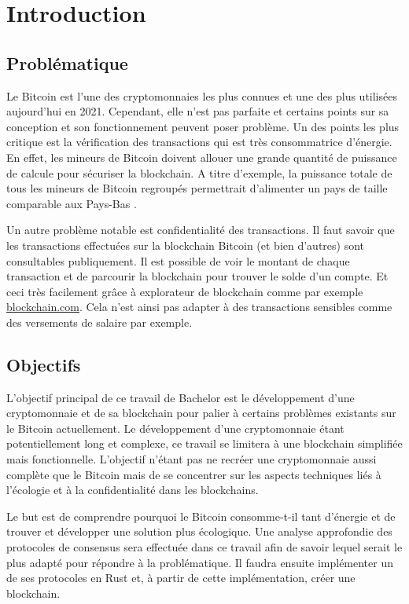 \documentclass[../tb_report.tex]{subfiles}
\begin{document}
\chapter{Introduction}
\label{ch:intro}

\section{Problématique}

Le Bitcoin est l'une des cryptomonnaies les plus connues et une des plus utilisées aujourd'hui en 2021. Cependant, elle n'est pas parfaite et certains points sur sa conception et son fonctionnement peuvent poser problème. Un des points les plus critique est la vérification des transactions qui est très consommatrice d'énergie. En effet, les mineurs de Bitcoin doivent allouer une grande quantité de puissance de calcule pour sécuriser la blockchain. A titre d'exemple, la puissance totale de tous les mineurs de Bitcoin regroupés permettrait d'alimenter un pays de taille comparable aux Pays-Bas \cite{BTC_cons}. 

Un autre problème notable est confidentialité des transactions. Il faut savoir que les transactions effectuées sur la blockchain Bitcoin (et bien d'autres) sont consultables publiquement. Il est possible de voir le montant de chaque transaction et de parcourir la blockchain pour trouver le solde d'un compte. Et ceci très facilement grâce à explorateur de blockchain comme par exemple \url{blockchain.com}. Cela n'est ainsi pas adapter à des transactions sensibles comme des versements de salaire par exemple.

\section{Objectifs}

L'objectif principal de ce travail de Bachelor est le développement d'une cryptomonnaie et de sa blockchain pour palier à certains problèmes existants sur le Bitcoin actuellement. Le développement d'une cryptomonnaie étant potentiellement long et complexe, ce travail se limitera à une blockchain simplifiée mais fonctionnelle. L'objectif n'étant pas ne recréer une cryptomonnaie aussi complète que le Bitcoin mais de se concentrer sur les aspects techniques liés à l'écologie et à la confidentialité dans les blockchains.

Le but est de comprendre pourquoi le Bitcoin consomme-t-il tant d'énergie et de trouver et développer une solution plus écologique. Une analyse approfondie des protocoles de consensus sera effectuée dans ce travail afin de savoir lequel serait le plus adapté pour répondre à la problématique. Il faudra ensuite implémenter un de ses protocoles en Rust et, à partir de cette implémentation, créer une blockchain.
\end{document}
